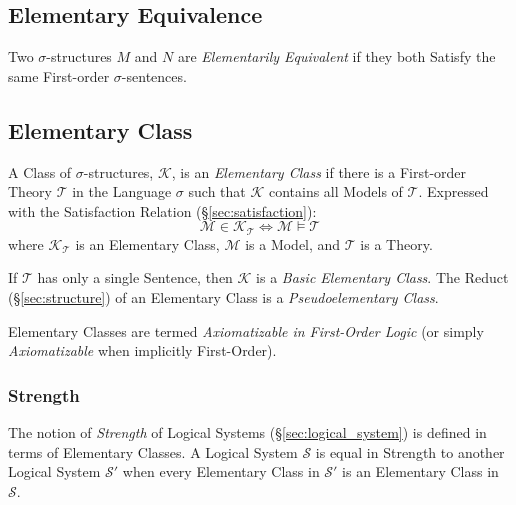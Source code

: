 \subsection{Elementary Equivalence}\label{sec:elementary_equivalence}

Two $\sigma$-structures $M$ and $N$ are \emph{Elementarily Equivalent}
if they both Satisfy the same First-order $\sigma$-sentences.



\subsection{Elementary Class}\label{sec:elementary_class}

A Class of $\sigma$-structures, $\mathcal{K}$, is an \emph{Elementary
  Class} if there is a First-order Theory $\mathcal{T}$ in the
Language $\sigma$ such that $\mathcal{K}$ contains all Models of
$\mathcal{T}$. Expressed with the Satisfaction Relation
(\S\ref{sec:satisfaction}):
\[
  \mathcal{M} \in \mathcal{K}_\mathcal{T}
  \Leftrightarrow \mathcal{M} \models \mathcal{T}
\]
where $\mathcal{K}_\mathcal{T}$ is an Elementary Class, $\mathcal{M}$
is a Model, and $\mathcal{T}$ is a Theory.

If $\mathcal{T}$ has only a single Sentence, then $\mathcal{K}$ is a
\emph{Basic Elementary Class}. The Reduct (\S\ref{sec:structure}) of
an Elementary Class is a \emph{Pseudoelementary Class}.

Elementary Classes are termed \emph{Axiomatizable in First-Order
  Logic} (or simply \emph{Axiomatizable} when implicitly First-Order).



\subsubsection{Strength}\label{sec:strength}

The notion of \emph{Strength} of Logical Systems
(\S\ref{sec:logical_system}) is defined in terms of Elementary
Classes. A Logical System $\mathcal{S}$ is equal in Strength to
another Logical System $\mathcal{S}'$ when every Elementary Class in
$\mathcal{S}'$ is an Elementary Class in $\mathcal{S}$.



